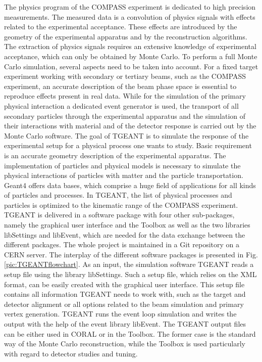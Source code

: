 The physics program of the COMPASS experiment is dedicated to high precision measurements. The measured data is a convolution of physics signals with effects related to the experimental acceptance. These effects are introduced by the geometry of the experimental apparatus and by the reconstruction algorithms. The extraction of physics signals requires an extensive knowledge of experimental acceptance, which can only be obtained by Monte Carlo.
To perform a full Monte Carlo simulation, several aspects need to be taken into account. For a fixed target experiment working with secondary or tertiary beams, such as the COMPASS experiment, an accurate description of the beam phase space is essential to reproduce effects present in real data. While for the simulation of the primary physical interaction a dedicated event generator is used, the transport of all secondary particles through the experimental apparatus and the simulation of their interactions with material and of the detector response is carried out by the Monte Carlo software.
The goal of TGEANT is to simulate the response of the experimental setup for a physical process one wants to study. Basic requirement is an accurate geometry description of the experimental apparatus. The implementation of particles and physical models is necessary to simulate the physical interactions of particles with matter and the particle transportation. Geant4 offers data bases, which comprise a huge field of applications for all kinds of particles and processes. In TGEANT, the list of physical processes and particles is optimized to the kinematic range of the COMPASS experiment.
TGEANT is delivered in a software package with four other sub-packages, namely the graphical user interface and the Toolbox as well as the two libraries libSettings and libEvent, which are needed for the data exchange between the different packages. The whole project is maintained in a Git repository on a CERN server. The interplay of the different software packages is presented in Fig. \ref{pic:TGEANTflowchart}. As an input, the simulation software TGEANT reads a setup file using the library libSettings. Such a setup file, which relies on the XML format, can be easily created with the graphical user interface. This setup file contains all information TGEANT needs to work with, such as the target and detector alignment or all options related to the beam simulation and primary vertex generation. TGEANT runs the event loop simulation and writes the output with the help of the event library libEvent. The TGEANT output files can be either used in CORAL or in the Toolbox. The former case is the standard way of the Monte Carlo reconstruction, while the Toolbox is used particularly with regard to detector studies and tuning.

